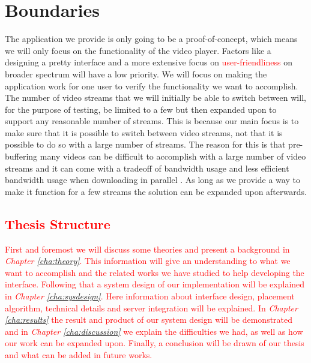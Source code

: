 \section{Boundaries}
\label{sec:boundaries}

The application we provide is only going to be a proof-of-concept, which means we will only focus on the functionality of the video player. Factors like a designing a pretty interface and a more extensive focus on \textcolor{red}{user-friendliness} on broader spectrum will have a low priority. We will focus on making the application work for one user to verify the functionality we want to accomplish. The number of video streams that we will initially be able to switch between will, for the purpose of testing, be limited to a few but then expanded upon to support any reasonable number of streams. This is because our main focus is to make sure that it is possible to switch between video streams, not that it is possible to do so with a large number of streams. The reason for this is that pre-buffering many videos can be difficult to accomplish with a large number of video streams and it can come with a tradeoff of bandwidth usage \cite{watchingprefetching} and less efficient bandwidth usage when downloading in parallel \cite{scalableOnDemand}. As long as we provide a way to make it function for a few streams the solution can be expanded upon afterwards.

\textcolor{red}{
\section{Thesis Structure}
First and foremost we will discuss some theories and present a background in \textit{Chapter \ref{cha:theory}}. This information will give an understanding to what we want to accomplish and the related works we have studied to help developing the interface. Following that a system design of our implementation will be explained in \textit{Chapter \ref{cha:sysdesign}}. Here information about interface design, placement algorithm, technical details and server integration will be explained. In \textit{Chapter \ref{cha:results}} the result and product of our system design will be demonstrated and in \textit{Chapter \ref{cha:discussion}} we explain the difficulties we had, as well as how our work can be expanded upon. Finally, a conclusion will be drawn of our thesis and what can be added in future works.}
